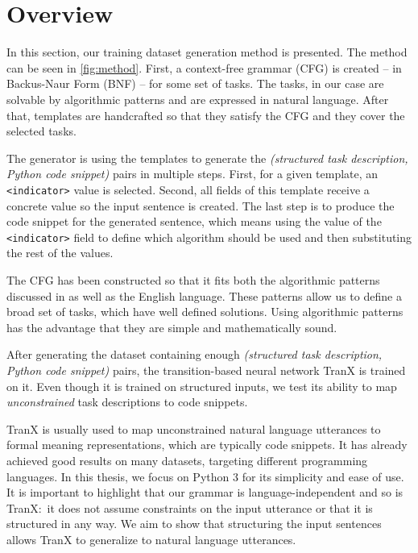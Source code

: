 \section{Overview}


In this section, our training dataset generation method is presented.
The method can be seen in \cref{fig:method}. First, a context-free
grammar (CFG) is created -- in Backus-Naur Form (BNF)\cite{bnf} -- for
some set of tasks. The tasks, in our case are solvable by algorithmic
patterns and are expressed in natural language. After that, templates
are handcrafted so that they satisfy the CFG and they cover the
selected tasks.

The generator is using the templates to generate the \emph{(structured task
description, Python code snippet)} pairs in multiple steps. First, for a given
template, an \verb|<indicator>| value is selected. Second, all fields of this
template receive a concrete value so the input sentence is created. The last
step is to produce the code snippet for the generated sentence, which means
using the value of the \verb|<indicator>| field to define which algorithm should
be used and then substituting the rest of the values.

The CFG has been constructed so that it fits both the algorithmic patterns
discussed in \cite{progT} as well as the English language. These patterns allow
us to define a broad set of tasks, which have well defined solutions. Using
algorithmic patterns has the advantage that they are simple and mathematically
sound.

After generating the dataset containing enough \emph{(structured task
description, Python code snippet)} pairs, the transition-based neural
network TranX \cite{tranx} is trained on it.
Even though it is trained on structured inputs, we test its ability
to map \emph{unconstrained} task descriptions to code snippets.

TranX is usually used to map unconstrained natural language utterances to formal
meaning representations, which are typically code snippets. It has already
achieved good results on many datasets, targeting different programming
languages. In this thesis, we focus on Python 3 for its simplicity and ease of
use. It is important to highlight that our grammar is language-independent and
so is TranX:~it does not assume constraints on the input utterance or that it is
structured in any way. We aim to show that structuring the input sentences
allows TranX to generalize to natural language utterances.

